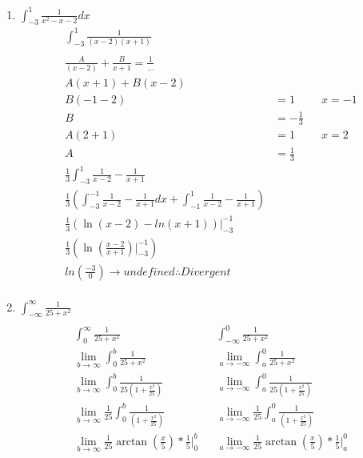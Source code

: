 \documentclass[11pt]{article}
\newcommand{\bv}[2]{\big\vert_{#1}^{#2}}
\begin{document}
    \begin{enumerate}
        \item $\int_{-3}^{1} \frac{1}{x^2 -x -2}dx$
        \begin{align*}
            \label{q2:1}
            \int_{-3}^{1} \frac{1}{(x-2)(x+1)} \\
            \\
            \frac{A}{(x-2)} + \frac{B}{x+1} = \frac{1}{...}\\
            A (x+1) + B (x-2) \\
            B(-1 -2) &= 1 && x = -1 \\
            B &= -\frac{1}{3} \\
            A (2 + 1) &= 1 && x = 2 \\
            A &= \frac{1}{3} \\
            \frac{1}{3}\int_{-3}^{1}  \frac{1}{x-2} - \frac{1}{x+1} \\
            \frac{1}{3} (\int_{-3}^{-1} \frac{1}{x-2} - \frac{1}{x+1}dx + \int_{-1}^{1} \frac{1}{x-2} - \frac{1}{x+1})\\
            \frac{1}{3}(\ln(x-2) - ln(x+1))\bv{-3}{-1}  \\
            \frac{1}{3}(\ln(\frac{x-2}{x+1}) \bv{-3}{-1}) \\
            ln(\frac{-3}{0})  \to undefined \therefore Divergent\\
        \end{align*}
        \item $\int_{-\infty}^{\infty}\frac{1}{25 + x^2} $
        \begin{align*}
            \label{q2:2}
            \\
            \int_{0}^{\infty} \frac{1}{25 + x^2} && \int_{-\infty}^{0} \frac{1}{25 + x^2} \\
            \lim_{b\to\infty} \int_{0}^{b} \frac{1}{25 + x^2} && \lim_{a\to-\infty} \int_{a}^{0} \frac{1}{25 + x^2} \\
            \lim_{b\to\infty} \int_{0}^{b} \frac{1}{25 (1 + \frac{x^2}{25})} && \lim_{a\to-\infty} \int_{a}^{0} \frac{1}{25 (1 + \frac{x^2}{25})} \\
            \lim_{b\to\infty} \frac{1}{25}\int_{0}^{b} \frac{1}{(1 + \frac{x^2}{25})} && \lim_{a\to-\infty} \frac{1}{25}\int_{a}^{0} \frac{1}{(1 + \frac{x^2}{25})} \\
            \lim_{b\to\infty}\frac{1}{25}\arctan(\frac{x}{5}) * \frac{1}{5} \bv{0}{b}&& \lim_{a\to-\infty}\frac{1}{25}\arctan(\frac{x}{5}) * \frac{1}{5} \bv{a}{0}\\

\end{align*}
\end{enumerate}
\end{document}
